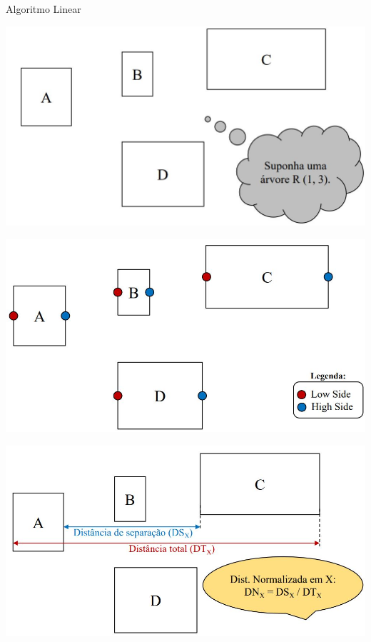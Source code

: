 \documentclass[compress,aspectratio=169]{beamer}
\begin{document}
\begin{frame}{Algoritmo Linear}

        \centering
        \includegraphics[width=0.75\linewidth]{inser.JPG}
        \label{fig:enter-label}
        
\end{frame}
\begin{frame}{}

        \centering
        \includegraphics[width=0.75\linewidth]{split1.jpg}
        \label{fig:enter-label}
        
\end{frame}

\begin{frame}{}

        \centering
        \includegraphics[width=0.75\linewidth]{split3.JPG}
        \label{fig:enter-label}
        
\end{frame}
\end{document}
